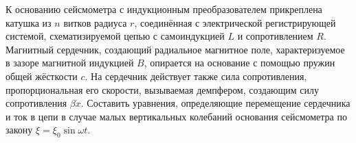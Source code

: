 К основанию сейсмометра с индукционным преобразователем
прикреплена катушка из $n$ витков радиуса $r$, соединённая с электрической
регистрирующей системой, схематизируемой цепью с самоиндукцией $L$
и сопротивлением $R$.
Магнитный сердечник, создающий радиальное магнитное поле, характеризуемое
в зазоре магнитной индукцией $B$, опирается на основание с помощью пружин
общей жёсткости $c$.
На сердечник действует также сила сопротивления, пропорциональная его скорости,
вызываемая демпфером, создающим силу сопротивления $\beta\dot{x}$.
Составить уравнения, определяющие перемещение сердечника и ток в цепи
в случае малых вертикальных колебаний основания сейсмометра
по закону $\xi = \xi _0\sin{\omega t}$.
